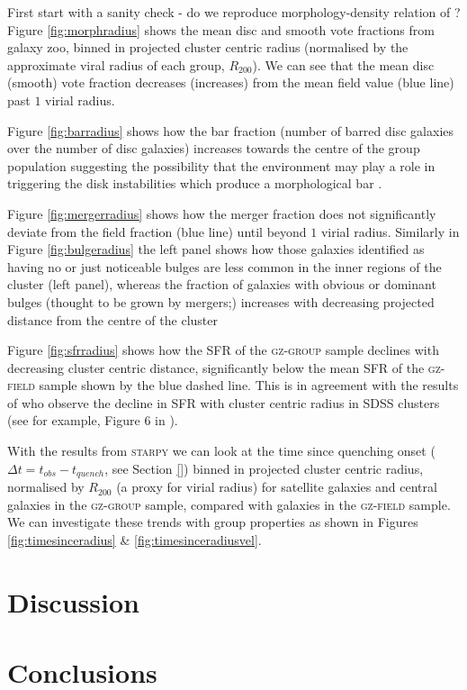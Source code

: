 \documentclass[useAMS,usenatbib]{mn2e}
\def\starpy ~{\textsc{starpy}}
\begin{document}
First start with a sanity check - do we reproduce morphology-density relation of \citealt{dressler80}? Figure \ref{fig:morphradius} shows the mean disc and smooth vote fractions from galaxy zoo, binned in projected cluster centric radius (normalised by the approximate viral radius of each group, $R_{200}$). We can see that the mean disc (smooth) vote fraction decreases (increases) from the mean field value (blue line) past $1$ virial radius.

Figure \ref{fig:barradius} shows how the bar fraction (number of barred disc galaxies over the number of disc galaxies) increases towards the centre of the group population suggesting the possibility that the environment may play a role in triggering the disk instabilities which produce a morphological bar \citep{ref, ref, ref}. 

Figure \ref{fig:mergerradius} shows how the merger fraction does not significantly deviate from the field fraction (blue line) until beyond $1$ virial radius. Similarly in Figure \ref{fig:bulgeradius} the left panel shows how those galaxies identified as having no or just noticeable bulges are less common in the inner regions of the cluster (left panel), whereas the fraction of galaxies with obvious or dominant bulges (thought to be grown by mergers;\citep{ref, ref, ref}) increases with decreasing projected distance from the centre of the cluster 

Figure \ref{fig:sfrradius} shows how the SFR of the \textsc{gz-group} sample declines with decreasing cluster centric distance, significantly below the mean SFR of the \textsc{gz-field} sample shown by the blue dashed line. This is in agreement with the results of \cite{gomez03} who observe the decline in SFR with cluster centric radius in SDSS clusters (see for example, Figure 6 in \citealt{gomez03}). 

With the results from \starpy~ we can look at the time since quenching onset ($\Delta t = t_{obs} - t_{quench}$, see Section \ref{}) binned in projected cluster centric radius, normalised by $R_{200}$ (a proxy for virial radius) for satellite galaxies and central galaxies in the \textsc{gz-group} sample, compared with galaxies in the \textsc{gz-field} sample. We can investigate these trends with group properties as shown in Figures \ref{fig:timesinceradius} \& \ref{fig:timesinceradiusvel}. 

\section{Discussion}\label{sec:disc}

\section{Conclusions}\label{sec:conc}





  
\end{document}
